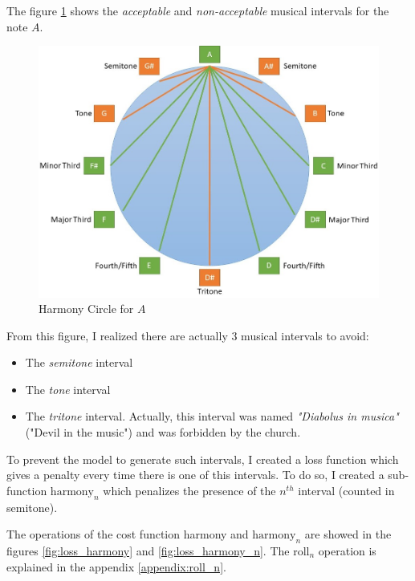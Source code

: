 \documentclass[12pt]{report}
\begin{document}
The figure \ref{fig:harmony_circle} shows the \textit{acceptable} and \textit{non-acceptable} musical intervals for the note $A$.

\begin{figure}[ht]
    \centering
    \includegraphics[width=\textwidth]{images/music/circle_harmony.jpg}
    \caption{Harmony Circle for $A$}
    \label{fig:harmony_circle}
\end{figure}

From this figure, I realized there are actually 3 musical intervals to avoid:
\begin{itemize}
    \item The \textit{semitone} interval
    \item The \textit{tone} interval
    \item The \textit{tritone} interval. Actually, this interval was named \textit{"Diabolus in musica"} ("Devil in the music") and was forbidden by the church.
\end{itemize}

To prevent the model to generate such intervals, I created a loss function which gives a penalty every time there is one of this intervals.
To do so, I created a sub-function $\text{harmony}_n$ which penalizes the presence of the $n^{th}$ interval (counted in semitone).

The operations of the cost function harmony and $\text{harmony}_n$ are showed in the figures \ref{fig:loss_harmony} and \ref{fig:loss_harmony_n}.
The $\text{roll}_n$ operation is explained in the appendix \ref{appendix:roll_n}.
\end{document}

